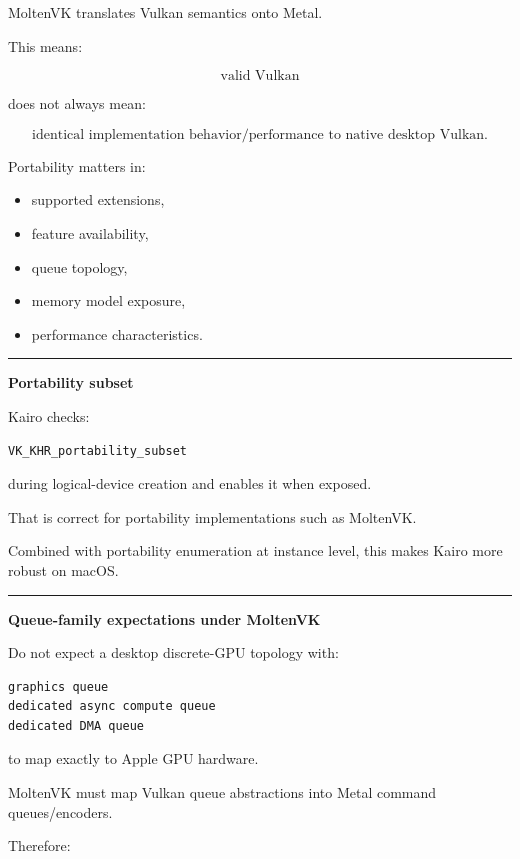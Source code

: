 MoltenVK translates Vulkan semantics onto Metal.

This means:

\[
\boxed{
\text{valid Vulkan}
}
\]

does not always mean:

\[
\boxed{
\text{identical implementation behavior/performance to native desktop Vulkan}.
}
\]

Portability matters in:

\begin{itemize}
\tightlist
\item
  supported extensions,
\item
  feature availability,
\item
  queue topology,
\item
  memory model exposure,
\item
  performance characteristics.
\end{itemize}

\begin{center}\rule{0.5\linewidth}{0.5pt}\end{center}

\textbf{Portability subset}

Kairo checks:

\begin{verbatim}
VK_KHR_portability_subset
\end{verbatim}

during logical-device creation and enables it when exposed.

That is correct for portability implementations such as MoltenVK.

Combined with portability enumeration at instance level, this makes Kairo more robust on macOS.

\begin{center}\rule{0.5\linewidth}{0.5pt}\end{center}

\textbf{Queue-family expectations under MoltenVK}

Do not expect a desktop discrete-GPU topology with:

\begin{verbatim}
graphics queue
dedicated async compute queue
dedicated DMA queue
\end{verbatim}

to map exactly to Apple GPU hardware.

MoltenVK must map Vulkan queue abstractions into Metal command queues/encoders.

Therefore:

